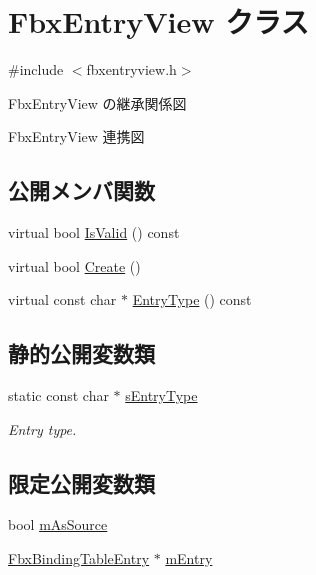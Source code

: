 \hypertarget{class_fbx_entry_view}{}\section{Fbx\+Entry\+View クラス}
\label{class_fbx_entry_view}


{\ttfamily \#include $<$fbxentryview.\+h$>$}



Fbx\+Entry\+View の継承関係図


Fbx\+Entry\+View 連携図
\subsection*{公開メンバ関数}
\begin{DoxyCompactItemize}
\item 
virtual bool \hyperlink{class_fbx_entry_view_a6bbdad937ef02ffbacd343fd71ed85d7}{Is\+Valid} () const
\item 
virtual bool \hyperlink{class_fbx_entry_view_aeff9d8adb34fe45d338c65483b52d2fc}{Create} ()
\item 
virtual const char $\ast$ \hyperlink{class_fbx_entry_view_a83ee50482b441ba8b0e6d7c2dba5432f}{Entry\+Type} () const
\end{DoxyCompactItemize}
\subsection*{静的公開変数類}
\begin{DoxyCompactItemize}
\item 
static const char $\ast$ \hyperlink{class_fbx_entry_view_a483b58dc47c39143426afe0d2076b6f6}{s\+Entry\+Type}
\begin{DoxyCompactList}\small\item\em Entry type. \end{DoxyCompactList}\end{DoxyCompactItemize}
\subsection*{限定公開変数類}
\begin{DoxyCompactItemize}
\item 
bool \hyperlink{class_fbx_entry_view_a274da88dfb87f2725f9c8fdbfe860c75}{m\+As\+Source}
\item 
\hyperlink{class_fbx_binding_table_entry}{Fbx\+Binding\+Table\+Entry} $\ast$ \hyperlink{class_fbx_entry_view_a74afe18ad35e48e7bd6dce480ab49ad7}{m\+Entry}
\end{DoxyCompactItemize}
